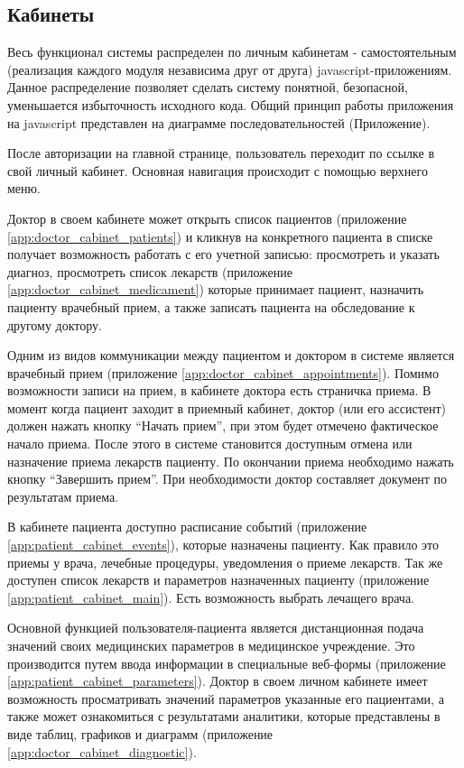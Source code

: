 \subsection{Кабинеты}
Весь функционал системы распределен по личным кабинетам - самостоятельным
(реализация каждого модуля независима друг от друга) javascript-приложениям.
Данное распределение позволяет сделать систему понятной, безопасной, уменьшается
избыточность исходного кода. Общий принцип работы приложения на javascript
представлен на диаграмме последовательностей (Приложение).

После авторизации на главной странице, пользователь переходит по ссылке в свой
личный кабинет. Основная навигация происходит с помощью верхнего меню.

Доктор в своем кабинете может открыть список пациентов (приложение
\ref{app:doctor_cabinet_patients}) и кликнув на конкретного пациента в списке
получает возможность работать с его учетной записью:
просмотреть и указать диагноз, просмотреть список лекарств (приложение
\ref{app:doctor_cabinet_medicament}) которые принимает пациент, назначить
пациенту врачебный прием, а также записать пациента на обследование к другому
доктору.

Одним из видов коммуникации между пациентом и доктором в системе является
врачебный прием (приложение \ref{app:doctor_cabinet_appointments}). Помимо
возможности записи на прием, в кабинете доктора есть страничка приема. В момент
когда пациент заходит в приемный кабинет, доктор (или его ассистент) должен
нажать кнопку “Начать прием”, при этом будет отмечено фактическое начало приема.
После этого в системе становится доступным отмена или назначение приема лекарств
пациенту. По окончании приема необходимо нажать кнопку “Завершить прием”. При
необходимости доктор составляет документ по результатам приема.

В кабинете пациента доступно расписание событий (приложение
\ref{app:patient_cabinet_events}), которые назначены пациенту.
Как правило это приемы у врача, лечебные процедуры, уведомления о приеме
лекарств.
Так же доступен список лекарств и параметров назначенных пациенту (приложение
\ref{app:patient_cabinet_main}).
Есть возможность выбрать лечащего врача.

Основной функцией пользователя-пациента является дистанционная подача  значений
своих медицинских параметров в медицинское учреждение. Это производится путем
ввода информации в специальные веб-формы (приложение
\ref{app:patient_cabinet_parameters}). Доктор в своем личном кабинете имеет
возможность просматривать значений параметров указанные его пациентами, а также
может ознакомиться с результатами аналитики, которые представлены в виде таблиц,
графиков и диаграмм (приложение \ref{app:doctor_cabinet_diagnostic}).


